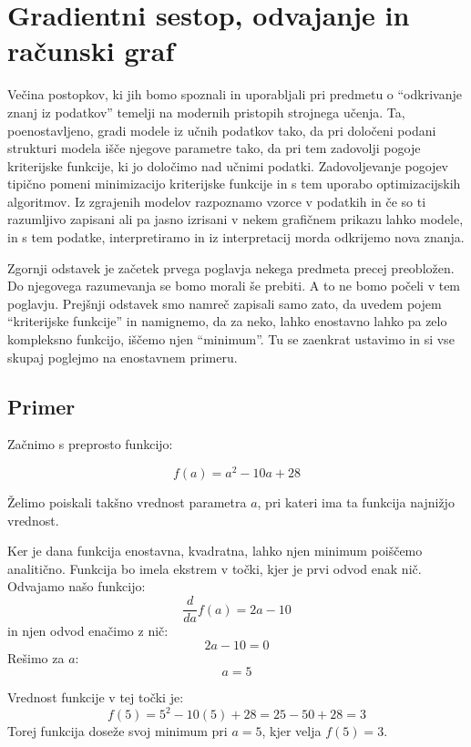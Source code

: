 \chapter{Gradientni sestop, odvajanje in računski graf}

Večina postopkov, ki jih bomo spoznali in uporabljali pri predmetu o ``odkrivanje znanj iz podatkov'' temelji na modernih pristopih strojnega učenja. Ta, poenostavljeno, gradi modele iz učnih podatkov tako, da pri določeni podani strukturi modela išče njegove parametre tako, da pri tem zadovolji pogoje kriterijske funkcije, ki jo določimo nad učnimi podatki. Zadovoljevanje pogojev tipično pomeni minimizacijo kriterijske funkcije in s tem uporabo optimizacijskih algoritmov. Iz zgrajenih modelov razpoznamo vzorce v podatkih in če so ti razumljivo zapisani ali pa jasno izrisani v nekem grafičnem prikazu lahko modele, in s tem podatke, interpretiramo in iz interpretacij morda odkrijemo nova znanja.

Zgornji odstavek je začetek prvega poglavja nekega predmeta precej preobložen. Do njegovega razumevanja se bomo morali še prebiti. A to ne bomo počeli v tem poglavju. Prejšnji odstavek smo namreč zapisali samo zato, da uvedem pojem ``kriterijske funkcije'' in namignemo, da za neko, lahko enostavno lahko pa zelo kompleksno funkcijo, iščemo njen ``minimum''. Tu se zaenkrat ustavimo in si vse skupaj poglejmo na enostavnem primeru.

\vspace*{5mm}
\section{Primer}

Začnimo s preprosto funkcijo: 

\[
f(a) = a^2 - 10a + 28
\]

\noindent Želimo poiskali takšno vrednost parametra \( a \), pri kateri ima ta funkcija najnižjo vrednost.

 Ker je dana funkcija enostavna, kvadratna, lahko njen minimum poiščemo analitično. Funkcija bo imela ekstrem v točki, kjer je prvi odvod enak nič. Odvajamo našo funkcijo:  
\[
\frac{d}{da} f(a) = 2a - 10
\]
%
in njen odvod enačimo z nič:  
\[
2a - 10 = 0
\]
Rešimo za \( a \):  
\[
a = 5
\]

Vrednost funkcije v tej točki je:  
\[
f(5) = 5^2 - 10(5) + 28 = 25 - 50 + 28 = 3
\]
Torej funkcija doseže svoj minimum pri \( a = 5 \), kjer velja \( f(5) = 3 \).  

